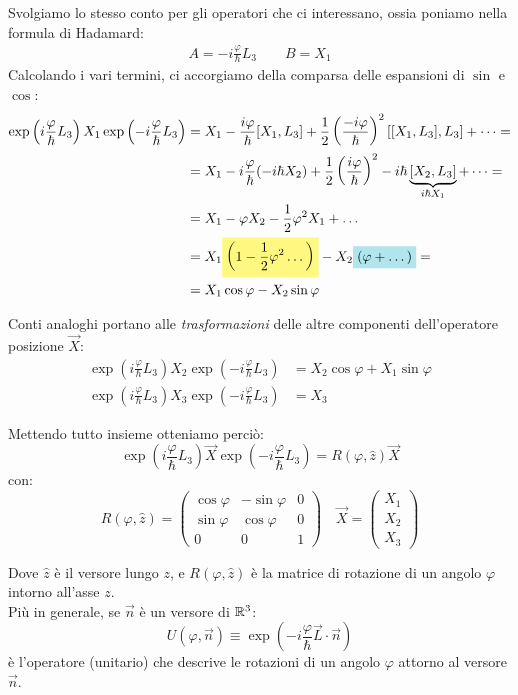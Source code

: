 \documentclass[../../FisicaTeorica.tex]{subfiles}
\begin{document}
Svolgiamo lo stesso conto per gli operatori che ci interessano, ossia poniamo nella formula di Hadamard:
\begin{align*}
A = -i\frac{\varphi}{\hbar}L_3\qquad B = X_1
\end{align*}
Calcolando i vari termini, ci accorgiamo della comparsa delle espansioni di $\sin$ e $\cos$:
\begin{align*}
\exp\left(i\frac{\varphi}{\hbar}L_3 \right) X_1 \exp\left(-i\frac{\varphi}{\hbar}L_3 \right) &= X_1 - \frac{i\varphi}{\hbar}[X_1, L_3]+ \frac{1}{2}\left(\frac{-i\varphi}{\hbar}\right)^2 [[X_1, L_3], L_3] + \dots =\\
&= X_1 - i\frac{\varphi}{\hbar}(-i\hbar X_2)+\frac{1}{2}\left(\frac{i\varphi}{\hbar}\right)^2 -i\hbar \underbrace{[X_2,L_3]}_{i\hbar X_1}+\dots=\\
&=X_1 - \varphi X_2 - \frac{1}{2}\varphi^2 X_1 + \dots \\
&= X_1\hlc{Yellow}{\left(1-\frac{1}{2}\varphi^2 \dots\right)} - X_2\hlc{SkyBlue}{(\varphi + \dots)} =\\
&= X_1 \cos\varphi - X_2 \sin\varphi
\end{align*} 

Conti analoghi portano alle \textit{trasformazioni} delle altre componenti dell'operatore posizione $\vec{X}$:
\begin{align*}
\exp\left(i\frac{\varphi}{\hbar}L_3\right) X_2 \exp\left(-i\frac{\varphi}{\hbar} L_3 \right)&=X_2 \cos\varphi+X_1\sin\varphi\\
\exp\left(i\frac{\varphi}{\hbar}L_3\right) X_3 \exp\left(-i\frac{\varphi}{\hbar}L_3\right)&= X_3
\end{align*}

Mettendo tutto insieme otteniamo perciò:
\[
\exp\left(i\frac{\varphi}{\hbar}L_3\right) \vec{X} \exp\left(-i\frac{\varphi}{\hbar}L_3 \right) = R(\varphi, \hat{z}) \vec{X}
\]
con:
\[
R(\varphi, \hat{z}) = \begin{pmatrix}
\cos\varphi & -\sin\varphi & 0\\
\sin\varphi & \cos\varphi & 0\\
0 & 0 & 1
\end{pmatrix}\quad
\vec{X}=\begin{pmatrix} X_1 \\ X_2 \\ X_3 \end{pmatrix}
\]

Dove $\hat{z}$ è il versore lungo $z$, e $R(\varphi, \hat{z})$ è la matrice di rotazione di un angolo $\varphi$ intorno all'asse $z$.\\
Più in generale, se $\vec{n}$ è un versore di $\mathbb{R}^3$:
\[
U(\varphi, \vec{n})\equiv \exp\left({-i\frac{\varphi}{\hbar} \vec{L}\cdot \vec{n}}\right)
\]
è l'operatore (unitario) che descrive le rotazioni di un angolo $\varphi$ attorno al versore $\vec{n}$.\\
\end{document}
